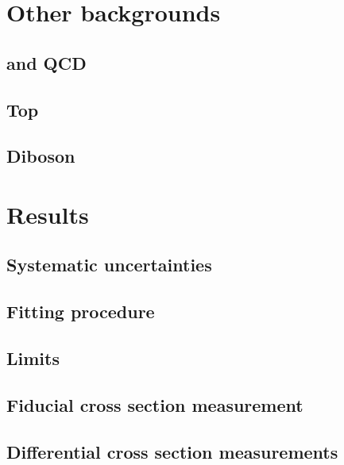 \documentclass[hyper,linkcolor=blue]{mythesis}
\begin{document}
\begin{mainmatter}
  \chapter{Other backgrounds}
    \label{chap:backgrounds}
    
    \section{\Wjets and QCD}
      \label{sec:wjets}
      
    \section{Top}
      \label{sec:top}
      
    \section{\Zjets}
      \label{sec:dy}
      
    \section{Diboson}
      \label{sec:diboson}
      

  \chapter{Results}
    \label{chap:results}
    
    \section{Systematic uncertainties}
      \label{sec:systematics}
      
    \section{Fitting procedure}
    \section{Limits}
    \section{Fiducial cross section measurement}
      \label{sec:fiducial}
      
    \section{Differential cross section measurements}
      \label{sec:unfolding}
      


\end{mainmatter}
\end{document}
